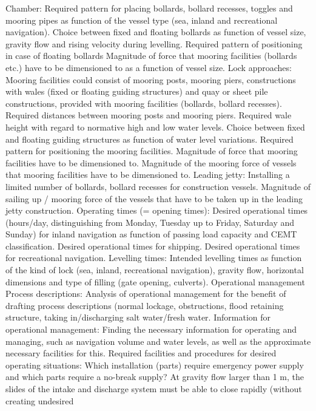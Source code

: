 Chamber:
Required pattern for placing bollards, bollard recesses, toggles
and mooring pipes as function of the vessel type (sea, inland and
recreational navigation).
Choice between fixed and floating bollards as function of vessel
size, gravity flow and rising velocity during levelling. Required pattern
of positioning in case of floating bollards
Magnitude of force that mooring facilities (bollards etc.) have to be
dimensioned to as a function of vessel size.
Lock approaches:
Mooring facilities could consist of mooring posts, mooring piers,
constructions with wales (fixed or floating guiding structures)
and quay or sheet pile constructions, provided with mooring facilities
(bollards, bollard recesses).
Required distances between mooring posts and mooring piers.
Required wale height with regard to normative high and low water
levels.
Choice between fixed and floating guiding structures as function of
water level variations.
Required pattern for positioning the mooring facilities.
Magnitude of force that mooring facilities have to be dimensioned
to.
Magnitude of the mooring force of vessels that mooring facilities
have to be dimensioned to.
Leading jetty:
Installing a limited number of bollards, bollard recesses for construction
vessels.
Magnitude of sailing up / mooring force of the vessels that have to
be taken up in the leading jetty construction.
Operating times (= opening times):
Desired operational times (hours/day, distinguishing from Monday,
Tuesday up to Friday, Saturday and Sunday) for inland navigation
as function of passing load capacity and CEMT classification.
Desired operational times for shipping.
Desired operational times for recreational navigation.
Levelling times:
Intended levelling times as function of the kind of lock (sea, inland,
recreational navigation), gravity flow, horizontal dimensions and
type of filling (gate opening, culverts).
Operational management
Process descriptions:
Analysis of operational management for the benefit of drafting process
descriptions (normal lockage, obstructions, flood retaining
structure, taking in/discharging salt water/fresh water.
Information for operational management:
Finding the necessary information for operating and managing,
such as navigation volume and water levels, as well as the approximate
necessary facilities for this.
Required facilities and procedures for desired operating situations:
Which installation (parts) require emergency power supply and
which parts require a no-break supply?
At gravity flow larger than 1 m, the slides of the intake and discharge
system must be able to close rapidly (without creating undesired
